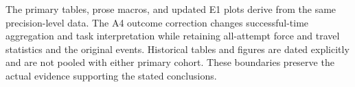 The primary tables, prose macros, and updated E1 plots derive from the same precision-level data. The A4 outcome correction changes successful-time aggregation and task interpretation while retaining all-attempt force and travel statistics and the original events. Historical tables and figures are dated explicitly and are not pooled with either primary cohort. These boundaries preserve the actual evidence supporting the stated conclusions.
